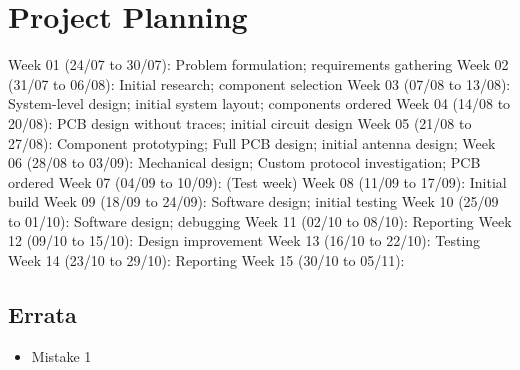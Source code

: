 \graphicspath{{./figures}}

\chapter{Project Planning}
Week 01 (24/07 to 30/07): Problem formulation; requirements gathering
Week 02 (31/07 to 06/08): Initial research; component selection
Week 03 (07/08 to 13/08): System-level design; initial system layout; components ordered
Week 04 (14/08 to 20/08): PCB design without traces; initial circuit design
Week 05 (21/08 to 27/08): Component prototyping; Full PCB design; initial antenna design;
Week 06 (28/08 to 03/09): Mechanical design; Custom protocol investigation; PCB ordered
Week 07 (04/09 to 10/09): (Test week)
Week 08 (11/09 to 17/09): Initial build
Week 09 (18/09 to 24/09): Software design; initial testing
Week 10 (25/09 to 01/10): Software design; debugging
Week 11 (02/10 to 08/10): Reporting
Week 12 (09/10 to 15/10): Design improvement
Week 13 (16/10 to 22/10): Testing
Week 14 (23/10 to 29/10): Reporting
Week 15 (30/10 to 05/11):



\section{Errata}
\begin{itemize}
    \item Mistake 1
\end{itemize}






